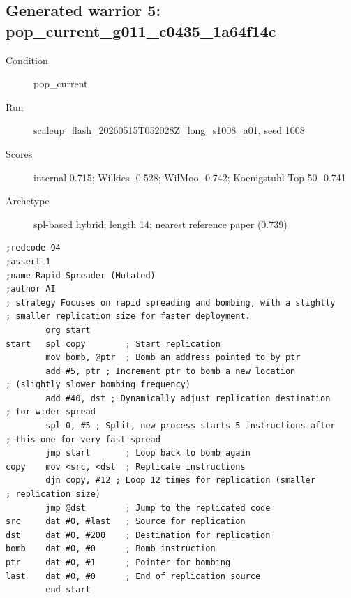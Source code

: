 \subsection*{Generated warrior 5: pop\_current\_g011\_c0435\_1a64f14c}
\begin{description}
\item[Condition] pop\_current
\item[Run] scaleup\_flash\_20260515T052028Z\_long\_s1008\_a01, seed 1008
\item[Scores] internal 0.715; Wilkies -0.528; WilMoo -0.742; Koenigstuhl Top-50 -0.741
\item[Archetype] spl-based hybrid; length 14; nearest reference paper (0.739)
\end{description}
\begingroup\small
\begin{verbatim}
;redcode-94
;assert 1
;name Rapid Spreader (Mutated)
;author AI
; strategy Focuses on rapid spreading and bombing, with a slightly
; smaller replication size for faster deployment.
        org start
start   spl copy        ; Start replication
        mov bomb, @ptr  ; Bomb an address pointed to by ptr
        add #5, ptr ; Increment ptr to bomb a new location
; (slightly slower bombing frequency)
        add #40, dst ; Dynamically adjust replication destination
; for wider spread
        spl 0, #5 ; Split, new process starts 5 instructions after
; this one for very fast spread
        jmp start       ; Loop back to bomb again
copy    mov <src, <dst  ; Replicate instructions
        djn copy, #12 ; Loop 12 times for replication (smaller
; replication size)
        jmp @dst        ; Jump to the replicated code
src     dat #0, #last   ; Source for replication
dst     dat #0, #200    ; Destination for replication
bomb    dat #0, #0      ; Bomb instruction
ptr     dat #0, #1      ; Pointer for bombing
last    dat #0, #0      ; End of replication source
        end start
\end{verbatim}
\endgroup

